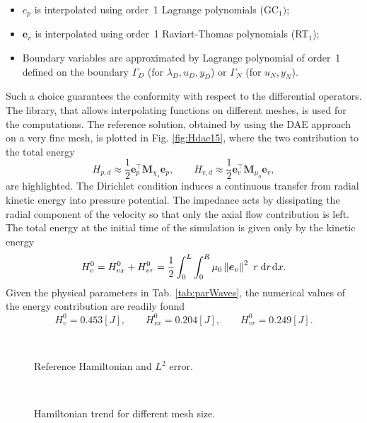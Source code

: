 \begin{itemize}
	\item $e_p$ is interpolated using order~1 Lagrange polynomials (GC$_1)$;
	\item $\bm{e}_v$ is interpolated using order~1 Raviart-Thomas polynomials (RT$_1$);
	\item Boundary variables are approximated by Lagrange polynomial of order~1 defined on the boundary $\Gamma_D$ (for $\lambda_D, u_D, y_D$) or $\Gamma_N$ (for $u_N, y_N$).
\end{itemize}

Such a choice guarantees the conformity with respect to the differential operators. The {} library, that allows interpolating functions on different meshes, is used for the computations. The reference solution, obtained by using the DAE approach on a very fine mesh, is plotted in Fig. \ref{fig:Hdae15}, where the two contribution to the total energy
\[
H_{p, d} \approx \frac{1}{2} \mathbf{e}_p^\top \mathbf{M}_{\chi_s} \mathbf{e}_p, \qquad H_{v, d} \approx \frac{1}{2} \mathbf{e}_v^\top \mathbf{M}_{\mu_0} \mathbf{e}_v, \]
are highlighted. The Dirichlet condition induces a continuous transfer from radial kinetic energy into pressure potential. The impedance acts by dissipating the radial component of the velocity so that only the axial flow contribution is left. The total energy at the initial time of the simulation is given only by the kinetic energy
\[
H_v^0 = H_{vx}^0 + H_{vr}^0 = \frac{1}{2} \int_{0}^L\int_{0}^R  \mu_0 \norm{\bm{e}_v}^2 \ r \d{r}\d{x}.
\]
Given the physical parameters in Tab. \ref{tab:parWaves}, the numerical values of the energy contribution are readily found
\[H_v^0 = 0.453 [J], \qquad H_{vx}^0 = 0.204 [J], \qquad H_{vr}^0 = 0.249 [J].\]

\begin{figure}[ht]%
	\centering
	\hspace{8pt}%
	 \\
	\caption[]{Reference Hamiltonian and $L^2$ error.}%
	\label{fig:Href_err}%
\end{figure}


\begin{figure}[ht]%
	\centering
	\hspace{8pt}%
	 \\
	\caption[]{Hamiltonian trend for different mesh size.}%
	\label{fig:Htrend}%
\end{figure}

